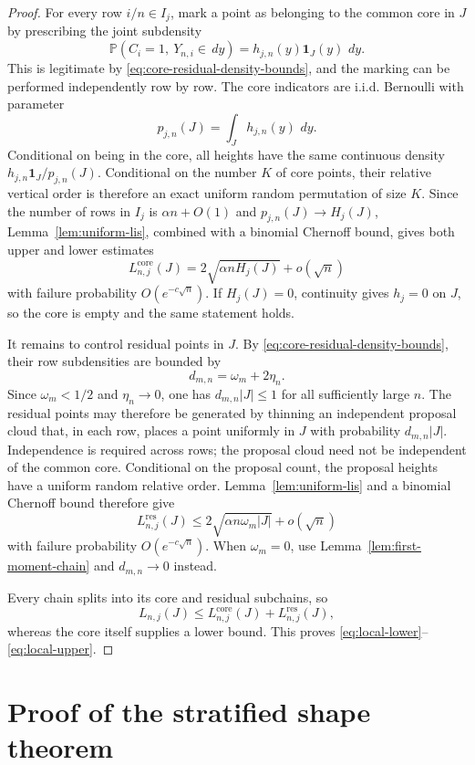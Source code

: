 \documentclass[11pt]{article}
\theoremstyle{remark}
\newcommand{\Pp}{\mathbb P}
\newcommand{\one}{\mathbf 1}
\newcommand{\dd}{\,d}
\begin{document}
\begin{proof}
For every row $i/n\in I_j$, mark a point as belonging to the common core in
$J$ by prescribing the joint subdensity
\[
        \Pp(C_i=1,\ Y_{n,i}\in\dd y)
        =h_{j,n}(y)\one_J(y)\,\dd y.
\]
This is legitimate by \eqref{eq:core-residual-density-bounds}, and the marking
can be performed independently row by row.  The core indicators are i.i.d.
Bernoulli with parameter
\[
        p_{j,n}(J)=\int_Jh_{j,n}(y)\,\dd y.
\]
Conditional on being in the core, all heights have the same continuous
density $h_{j,n}\one_J/p_{j,n}(J)$.  Conditional on the number $K$ of core
points, their relative vertical order is therefore an exact uniform random
permutation of size $K$.  Since the number of rows in $I_j$ is
$\alpha n+O(1)$ and $p_{j,n}(J)\to H_j(J)$, Lemma~\ref{lem:uniform-lis},
combined with a binomial Chernoff bound, gives both upper and lower estimates
\[
        L_{n,j}^{\mathrm{core}}(J)
        =2\sqrt{\alpha nH_j(J)}+o(\sqrt n)
\]
with failure probability $O(e^{-c\sqrt n})$.  If $H_j(J)=0$, continuity gives
$h_j=0$ on $J$, so the core is empty and the same statement holds.

It remains to control residual points in $J$.  By
\eqref{eq:core-residual-density-bounds}, their row subdensities are bounded by
\[
        d_{m,n}=\omega_m+2\eta_n.
\]
Since $\omega_m<1/2$ and $\eta_n\to0$, one has
$d_{m,n}|J|\le1$ for all sufficiently large $n$.  The residual points may
therefore be generated by thinning an independent proposal cloud that, in
each row, places a point uniformly in $J$ with probability $d_{m,n}|J|$.
Independence is required across rows; the proposal cloud need not be
independent of the common core.
Conditional on the proposal count, the proposal heights have a uniform random
relative order.  Lemma~\ref{lem:uniform-lis} and a
binomial Chernoff bound therefore give
\[
        L_{n,j}^{\mathrm{res}}(J)
        \le2\sqrt{\alpha n\omega_m|J|}+o(\sqrt n)
\]
with failure probability $O(e^{-c\sqrt n})$.  When $\omega_m=0$, use
Lemma~\ref{lem:first-moment-chain} and $d_{m,n}\to0$ instead.

Every chain splits into its core and residual subchains, so
\[
        L_{n,j}(J)
        \le L_{n,j}^{\mathrm{core}}(J)
           +L_{n,j}^{\mathrm{res}}(J),
\]
whereas the core itself supplies a lower bound.  This proves
\eqref{eq:local-lower}--\eqref{eq:local-upper}.
\end{proof}



\section{Proof of the stratified shape theorem}
\label{sec:shape-proof}
\end{document}
